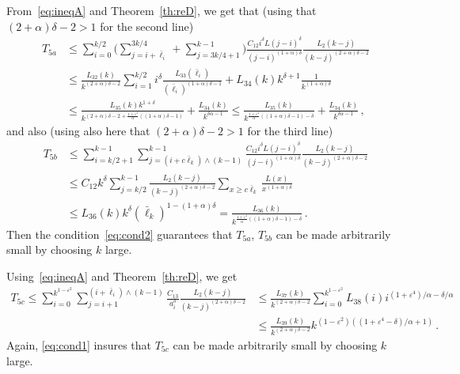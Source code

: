 \documentclass[10pt]{amsart}
\theoremstyle{definition}\newtheorem{defi}[theo]{Definition}\newtheorem{rema}[theo]{Remark}\newtheorem{exam}[theo]{Example}\newtheorem{exem}[theo]{Example}\newtheorem{nota}[theo]{Notation}
\newcommand{\ga}{\alpha}
\newcommand{\gd}{\delta}
\newcommand{\gep}{\varepsilon}
\begin{document}
From~\eqref{eq:ineqA} and Theorem~\ref{th:reD}, we get that (using that $(2+\ga)\gd -2>1$ for the second line)
\begin{equation}
\begin{split}
T_{5a} & \le \sum_{i=0}^{ k/2 } \bigg(\sum_{j=i + \bar \ell_i }^{ 3k/4} + \sum_{j= 3k/4+1 }^{k-1} \bigg) \frac{C_{12}i^{\gd}L(j-i)^{\gd}}{(j-i)^{(1+\ga) \delta }} \frac{L_2(k-j)}{(k-j)^{(2+\ga)\delta -2}} \\
& \le \frac{L_{32}(k)}{k^{(2+\ga)\gd -2}} \sum_{i=1}^{k/2} i^{\gd} \frac{L_{33}(\bar \ell_i)}{(\bar \ell_i)^{(1+\ga)\gd -1 }} +L_{34}(k) k^{\gd+1} \frac{1}{k^{(1+ \ga)\gd }} \\
&\le \frac{L_{35}(k) k^{1+\gd}}{k^{(2+\ga)\gd -2 + \tfrac{1+\gep^4}{\ga}((1+\ga)\gd-1)}}+ \frac{L_{34}(k)}{k^{\delta \ga -1 }} \leq \frac{L_{35}(k) }{ k^{\tfrac{1+\gep^4}{\ga}((1+\ga)\gd-1) -\gd }} + \frac{L_{34}(k)}{k^{\delta \ga -1 }}\,,
\end{split}
\end{equation}
and also (using also here that $(2+\ga)\gd -2>1$ for the third line)
\begin{equation}
\begin{split}
T_{5b} & \le \sum_{i= k/2+1}^{k-1} \sum_{j=(i+ c \bar \ell_k) \wedge (k-1)}^{k-1} \frac{C_{12} i^{\gd}L(j-i)^{\gd}}{(j-i)^{(1+\ga) \delta}} \frac{L_2(k-j)}{(k-j)^{(2+\ga)\delta -2}} \\
&\le C_{12} k^{\gd} \sum_{j=k/2}^{k-1} \frac{L_2(k-j)}{(k-j)^{(2+\ga)\delta -2}} \sum_{x\geq c \bar\ell_k}\frac{L(x)}{ x^{(1+\ga)\gd}} \\
& \le L_{36}(k) k^{\gd} (\bar\ell_k)^{1-(1+\ga)\gd} =\frac{L_{36}(k)}{k^{\tfrac{1+\gep^4}{\ga}((1+\ga)\gd -1) - \gd }}\,.
\end{split}
\end{equation}
Then the condition~\eqref{eq:cond2} guarantees that $T_{5a}$, $T_{5b}$ can be made arbitrarily small by choosing $k$ large.


Using~\eqref{eq:ineqA} and Theorem~\ref{th:reD}, we get
\begin{equation}
\begin{split}
T_{5c} \le \sum_{i=0}^{ k^{1- \gep^ 2} } \sum_{j=i + 1}^{(i+ \bar\ell_i) \wedge (k-1)} \frac{C_{13}}{a_i^{\gd}} \frac{L_2(k-j)}{(k-j)^{(2+\ga)\delta -2}} &\le \frac{L_{37}(k)}{k^{(2+\ga) \delta -2}} \sum_{i=0}^{ k^{1- \gep^ 2} } L_{38}(i) i^{(1+\gep^4)/\ga -\gd/\ga} \\
& \le \frac{L_{39}(k)}{k^{(2+\ga) \delta -2}} k^{(1-\gep^2) ((1+\gep^4-\gd)/\ga +1) }\,.
\end{split}
\end{equation}
Again, \eqref{eq:cond1} insures that $T_{5c}$ can be made arbitrarily small by choosing $k$ large.
\end{document}
